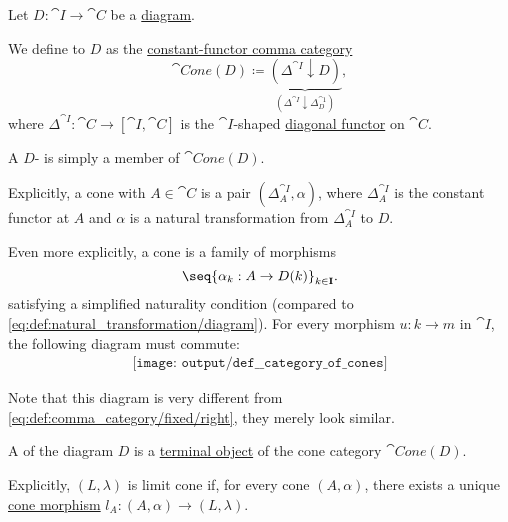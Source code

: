 \begin{definition}\label{def:category_of_cones}
  Let \( D: \cat{I} \to \cat{C} \) be a \hyperref[def:categorical_diagram]{diagram}.

  \begin{thmenum}
     We define  to \( D \) as the \hyperref[def:comma_category/fixed]{constant-functor comma category}
    \begin{equation*}
      \cat{Cone}(D) \coloneqq \underbrace{ (\Delta^{\cat{I}} \downarrow D) }_{(\Delta^{\cat{I}} \downarrow \Delta^{\cat{1}}_{D})},
    \end{equation*}
    where \( \Delta^{\cat{I}}: \cat{C} \to [\cat{I}, \cat{C}] \) is the \( \cat{I} \)-shaped \hyperref[def:diagonal_functor]{diagonal functor} on \( \cat{C} \).

     A \( D \)- is simply a member of \( \cat{Cone}(D) \).

    Explicitly, a cone with  \( A \in \cat{C} \) is a pair \( (\Delta^{\cat{I}}_A, \alpha) \), where \( \Delta^{\cat{I}}_A \) is the constant functor at \( A \) and \( \alpha \) is a natural transformation from \( \Delta^{\cat{I}}_A \) to \( D \).

    Even more explicitly, a cone is a family of morphisms
    \begin{equation}\label{eq:def:category_of_cones/cone}
      \seq{ \alpha_k: A \to D(k) }_{k \in \cat{I}}.
    \end{equation}
    satisfying a simplified naturality condition (compared to \eqref{eq:def:natural_transformation/diagram}). For every morphism \( u: k \to m \) in \( \cat{I} \), the following diagram must commute:
    \begin{equation}\label{eq:def:category_of_cones/cone_nat}
      \begin{aligned}
        \texttt{[image: output/def\_\_category\_of\_cones]}
      \end{aligned}
    \end{equation}

    Note that this diagram is very different from \eqref{eq:def:comma_category/fixed/right}, they merely look similar.

     A  of the diagram \( D \) is a \hyperref[def:universal_objects/terminal]{terminal object} of the cone category \( \cat{Cone}(D) \).

    Explicitly, \( (L, \lambda) \) is limit cone if, for every cone \( (A, \alpha) \), there exists a unique \hyperref[eq:def:comma_category/fixed/right]{cone morphism} \( l_A: (A, \alpha) \to (L, \lambda) \).


\end{thmenum}
\end{definition}
